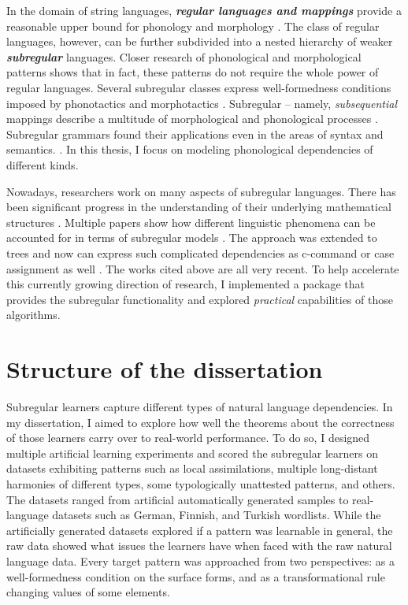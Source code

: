 In the domain of string languages, \textbf{\emph{regular languages and mappings}} provide a reasonable upper bound for phonology and morphology \citep{Johnson1972,Koskenniemi1983,KaplanKay94,BeesleyKartunnen03}.
The class of regular languages, however, can be further subdivided into a nested hierarchy of weaker \textbf{\emph{subregular}} languages.
Closer research of phonological and morphological patterns shows that in fact, these patterns do not require the whole power of regular languages.
Several subregular classes express well-formedness conditions imposed by phonotactics and morphotactics \citep{HeinzRawal11,AksenovaEtAl16,Heinz-2018-CNPG}.
Subregular -- namely, \emph{subsequential} mappings describe a multitude of morphological and phonological processes \citep{Chandlee2017,ChandleeHeinz2018}.
Subregular grammars found their applications even in the areas of syntax and semantics. \citep{DeSantoGrafDrury2017,GrafShafiei19SCiL,Graf19AC}.
In this thesis, I focus on modeling phonological dependencies of different kinds.


Nowadays, researchers work on many aspects of subregular languages.
There has been significant progress in the understanding of their underlying mathematical structures \citep{Fu2011,HeinzRogers2013}.
Multiple papers show how different linguistic phenomena can be accounted for in terms of subregular models \citep{HeinzRawal11,Heinz-Lai-2013-VHS,Chandlee2014,AksenovaEtAl16,DolatianHeinz2018,Graf19AC,Karakas2020}.
The approach was extended to trees and now can express such complicated dependencies as c-command or case assignment as well  \citep{GrafShafiei19SCiL,VuEtAl19SCiL}.
The works cited above are all very recent.
To help accelerate this currently growing direction of research, I implemented a package that provides the subregular functionality and explored \emph{practical} capabilities of those algorithms.


\section{Structure of the dissertation}

Subregular learners capture different types of natural language dependencies.
In my dissertation, I aimed to explore how well the theorems about the correctness of those learners carry over to real-world performance.
To do so, I designed multiple artificial learning experiments and scored the subregular learners on datasets exhibiting patterns such as local assimilations, multiple long-distant harmonies of different types, some typologically unattested patterns, and others.
The datasets ranged from artificial automatically generated samples to real-language datasets such as German, Finnish, and Turkish wordlists.
While the artificially generated datasets explored if a pattern was learnable in general, the raw data showed what issues the learners have when faced with the raw natural language data.
Every target pattern was approached from two perspectives: as a well-formedness condition on the surface forms, and as a transformational rule changing values of some elements.



